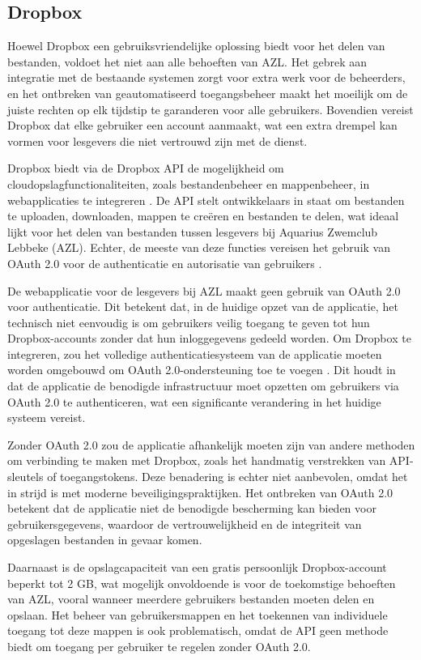 \subsection{Dropbox}
Hoewel Dropbox een gebruiksvriendelijke oplossing biedt voor het delen van bestanden, voldoet het niet aan alle behoeften van AZL. 
Het gebrek aan integratie met de bestaande systemen zorgt voor extra werk voor de beheerders, en het ontbreken van geautomatiseerd 
toegangsbeheer maakt het moeilijk om de juiste rechten op elk tijdstip te garanderen voor alle gebruikers. Bovendien vereist Dropbox dat 
elke gebruiker een account aanmaakt, wat een extra drempel kan vormen voor lesgevers die niet vertrouwd zijn met de dienst.

Dropbox biedt via de Dropbox API de mogelijkheid om cloudopslagfunctionaliteiten, zoals bestandenbeheer en mappenbeheer, in webapplicaties te integreren \autocite{dropbox_api}. 
De API stelt ontwikkelaars in staat om bestanden te uploaden, downloaden, mappen te creëren en bestanden te delen, wat ideaal lijkt voor het delen van 
bestanden tussen lesgevers bij Aquarius Zwemclub Lebbeke (AZL). Echter, de meeste van deze functies vereisen het gebruik van OAuth 2.0 voor de authenticatie 
en autorisatie van gebruikers \autocite{dropbox_oauth}.

De webapplicatie voor de lesgevers bij AZL maakt geen gebruik van OAuth 2.0 voor authenticatie. Dit betekent dat, in de huidige opzet van de applicatie, 
het technisch niet eenvoudig is om gebruikers veilig toegang te geven tot hun Dropbox-accounts zonder dat hun inloggegevens gedeeld worden. Om Dropbox te 
integreren, zou het volledige authenticatiesysteem van de applicatie moeten worden omgebouwd om OAuth 2.0-ondersteuning toe te voegen \autocite{dropbox_oauth}. Dit houdt in dat de 
applicatie de benodigde infrastructuur moet opzetten om gebruikers via OAuth 2.0 te authenticeren, wat een significante verandering in het huidige systeem vereist.

Zonder OAuth 2.0 zou de applicatie afhankelijk moeten zijn van andere methoden om verbinding te maken met Dropbox, zoals het handmatig verstrekken van API-sleutels 
of toegangstokens. Deze benadering is echter niet aanbevolen, omdat het in strijd is met moderne beveiligingspraktijken. Het ontbreken van OAuth 2.0 betekent 
dat de applicatie niet de benodigde bescherming kan bieden voor gebruikersgegevens, waardoor de vertrouwelijkheid en de integriteit van opgeslagen bestanden 
in gevaar komen.

Daarnaast is de opslagcapaciteit van een gratis persoonlijk Dropbox-account beperkt tot 2 GB, wat mogelijk onvoldoende is voor de toekomstige behoeften van AZL, 
vooral wanneer meerdere gebruikers bestanden moeten delen en opslaan. Het beheer van gebruikersmappen en het toekennen van individuele toegang tot deze 
mappen is ook problematisch, omdat de API geen methode biedt om toegang per gebruiker te regelen zonder OAuth 2.0.

